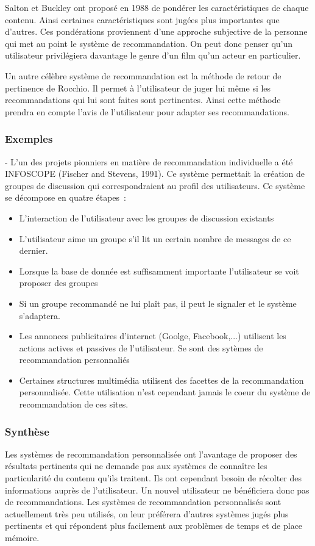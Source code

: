 \documentclass{article}
\begin{document}
Salton et Buckley ont proposé en 1988 de pondérer les caractéristiques de chaque contenu. Ainsi certaines caractéristiques sont jugées plus importantes que d'autres. Ces pondérations proviennent d'une approche subjective de la personne qui met au point le système de recommandation. On peut donc penser qu'un utilisateur privilégiera davantage le genre d'un film qu'un acteur en particulier.

Un autre célèbre système de recommandation est la méthode de retour de pertinence de Rocchio. Il permet à l'utilisateur de juger lui même si les recommandations qui lui sont faites sont pertinentes. Ainsi cette méthode prendra en compte l'avis de l'utilisateur pour adapter ses recommandations.


\subsubsection{Exemples}

- L'un des projets pionniers en matière de recommandation individuelle a été INFOSCOPE (Fischer and Stevens, 1991). Ce système permettait la création de groupes de discussion qui correspondraient au profil des utilisateurs. Ce système se décompose en quatre étapes~:
\begin{itemize}
    \item L'interaction de l'utilisateur avec les groupes de discussion existants
    \item L'utilisateur aime un groupe s'il lit un certain nombre de messages de ce dernier.
    \item Lorsque la base de donnée est suffisamment importante l'utilisateur se voit proposer des groupes
    \item Si un groupe recommandé ne lui plaît pas, il peut le signaler et le système s'adaptera.
\end{itemize}

\begin{itemize}
\item Les annonces publicitaires d'internet (Goolge, Facebook,...) utilisent les actions actives et passives de l'utilisateur. Se sont des sytèmes de recommandation personnaliés

\item Certaines structures multimédia utilisent des facettes de la recommandation personnalisée. Cette utilisation n'est cependant jamais le coeur du système de recommandation de ces sites.
\end{itemize}

\subsubsection{Synthèse}
Les systèmes de recommandation personnalisée ont l'avantage de proposer des résultats pertinents qui ne demande pas aux systèmes de connaître les particularité du contenu qu'ils traitent. Ils ont cependant besoin de récolter des informations auprès de l'utilisateur. Un nouvel utilisateur ne bénéficiera donc pas de recommandations.
Les systèmes de recommandation personnalisés sont actuellement très peu utilisés, on leur préférera d'autres systèmes jugés plus pertinents et qui répondent plus facilement aux problèmes de temps et de place mémoire. 
\end{document}
